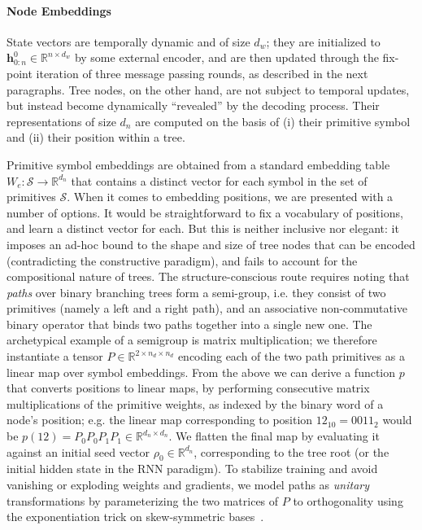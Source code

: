 \paragraph{Node Embeddings}
State vectors are temporally dynamic and of size $d_w$; they are initialized to $\mathbf{h}_{0:n}^0 \in \mathbb{R}^{n\times d_w}$ by some external encoder, and are then updated through the fix-point iteration of three message passing rounds, as described in the next paragraphs.
Tree nodes, on the other hand, are not subject to temporal updates, but instead become dynamically ``revealed'' by the decoding process. 
Their representations of size $d_n$ are computed on the basis of (i) their primitive symbol and (ii) their position within a tree.

Primitive symbol embeddings are obtained from a standard embedding table $W_e: \mathcal{S} \to \mathbb{R}^{d_n}$ that contains a distinct vector for each symbol in the set of primitives $\mathcal{S}$. 
When it comes to embedding positions, we are presented with a number of options.
It would be straightforward to fix a vocabulary of positions, and learn a distinct vector for each.
But this is neither inclusive nor elegant: it imposes an ad-hoc bound to the shape and size of tree nodes that can be encoded (contradicting the constructive paradigm), and fails to account for the compositional nature of trees.
The structure-conscious route requires noting that \textit{paths} over binary branching trees form a semi-group, i.e. they consist of two primitives (namely a left and a right path), and an associative non-commutative binary operator that binds two paths together into a single new one.
The archetypical example of a semigroup is matrix multiplication; we therefore instantiate a tensor $P \in \mathbb{R}^{2 \times n_d \times n_d}$ encoding each of the two path primitives as a linear map over symbol embeddings.
From the above we can derive a function $p$ that converts positions to linear maps, by performing consecutive matrix multiplications of the primitive weights, as indexed by the binary word of a node's position; e.g. the linear map corresponding to position $12_{10} = 0011_{2}$ would be $p(12) = P_0P_0P_1P_1 \in \mathbb{R}^{d_n \times d_n}$.
We flatten the final map by evaluating it against an initial seed vector $\rho_0 \in \mathbb{R}^{d_n}$, corresponding to the tree root (or the initial hidden state in the RNN paradigm).
To stabilize training and avoid vanishing or exploding weights and gradients, we model paths as \textit{unitary} transformations by parameterizing the two matrices of $P$ to orthogonality using the exponentiation trick on skew-symmetric bases~\cite{bader2019computing,lezcano2019trivializations}.
